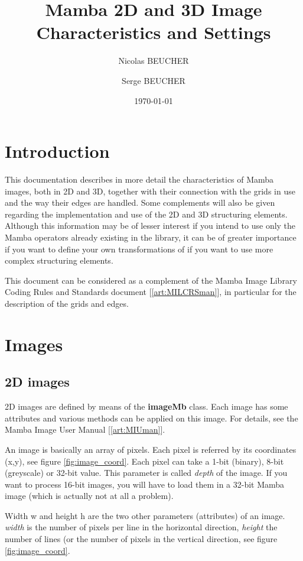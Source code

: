 \documentclass[a4paper,10pt,oneside]{article}
\title{Mamba 2D and 3D Image Characteristics and Settings}
\author{Nicolas BEUCHER \and Serge BEUCHER}
\date{\today}
\begin{document}
\mambaCover
\mambaContent
\mambaFigures

\section{Introduction}
This documentation describes in more detail the characteristics of Mamba images, both in
2D and 3D, together with their connection with the grids in use and the way their edges are handled.
Some complements will also be given regarding the implementation and use of the 2D and 3D
structuring elements. Although this information may be of lesser interest if you intend to use
only the Mamba operators already existing in the library, it can be of greater importance if you
want to define your own transformations of if you want to use more complex structuring elements.

This document can be considered as a complement of the Mamba Image Library Coding Rules and Standards
document [\ref{art:MILCRSman}], in particular for the description of the grids and edges.

\section{Images}
\subsection{2D images}
2D images are defined by means of the \textbf{imageMb} class. Each image has some attributes and
various methods can be applied on this image. For details, see the Mamba Image User Manual [\ref{art:MIUman}].

An image is basically an array of pixels. Each pixel is referred by its coordinates (x,y), see
figure \ref{fig:image_coord}. Each pixel can take a 1-bit (binary), 8-bit (greyscale) or 32-bit value.
This parameter is called \textit{depth} of the image. If you want to process 16-bit images, you will have to
load them in a 32-bit Mamba image (which is actually not at all a problem).

Width w and height h are the two other parameters (attributes) of an image. \textit{width} is the number of
pixels per line in the horizontal direction, \textit{height} the number of lines (or the number of pixels in
the vertical direction, see figure \ref{fig:image_coord}.
\end{document}
